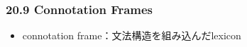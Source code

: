 
\begin{frame}
    \frametitle{20.9 Connotation Frames}
    \begin{itemize}
        \item connotation frame：文法構造を組み込んだlexicon
    \end{itemize}
\end{frame}
